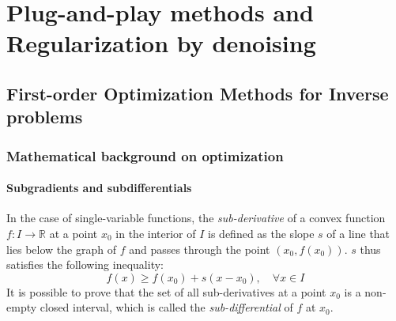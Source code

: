 \chapter{Plug-and-play methods and Regularization by denoising}

\section{First-order Optimization Methods for Inverse problems}

\subsection{Mathematical background on optimization}

\subsubsection{Subgradients and subdifferentials}

In the case of single-variable functions, the \textit{sub-derivative} of a convex function $f: I \to \mathbb{R}$ at a point $x_0$ in the interior of $I$ is defined as the slope $s$ of a line that lies below the graph of $f$ and passes through the point $(x_0, f(x_0))$. $s$ thus satisfies the following inequality:
\begin{equation}
    f(x)\geq f(x_0) + s (x - x_0), \quad \forall x \in I
\end{equation}
It is possible to prove that the set of all sub-derivatives at a point $x_0$ is a non-empty closed interval, which is called the \textit{sub-differential} of $f$ at $x_0$.


